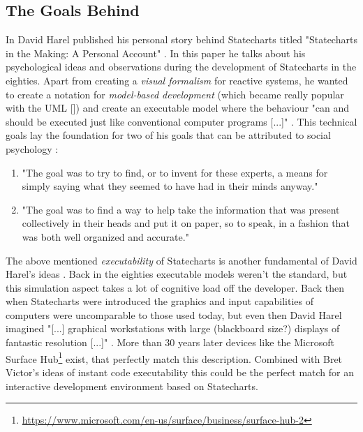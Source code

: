 \subsection{The Goals Behind}
\label{sub:goals-behind-statecharts}
In \citeyear{harel_statecharts_2007} David Harel published his personal story behind Statecharts titled "Statecharts in the Making: A Personal Account" \autocite{harel_statecharts_2007}.
In this paper he talks about his psychological ideas and observations during the development of Statecharts in the eighties.
Apart from creating a \emph{visual formalism} for reactive systems, he wanted to create a notation for \emph{model-based development} (which became really popular with the UML [\textcite{cook_unified_2017}]) and create an executable model where the behaviour "can and should be executed just like conventional computer programs [...]" \autocite[1]{harel_statecharts_2007}.
This technical goals lay the foundation for two of his goals that can be attributed to social psychology \autocite[3--4]{harel_statecharts_2007}:
\begin{enumerate}
    \item "The goal was to try to find, or to invent for these experts, a means for simply saying what they seemed to have had in their minds anyway."
    \item "The goal was to find a way to help take the information that was present collectively in their heads and put it on paper, so to speak, in a fashion that was both well organized and accurate."
\end{enumerate}

The above mentioned \emph{executability} of Statecharts is another fundamental of David Harel's ideas \autocite[7]{harel_modeling_1998}.
Back in the eighties executable models weren't the standard, but this simulation aspect takes a lot of cognitive load off the developer.
Back then when Statecharts were introduced the graphics and input capabilities of computers were uncomparable to those used today, but even then David Harel imagined "[...] graphical workstations with large (blackboard size?) displays of fantastic resolution [...]" \autocite[272]{harel_statecharts:_1987}.
More than 30 years later devices like the Microsoft Surface Hub\footnote{\url{https://www.microsoft.com/en-us/surface/business/surface-hub-2}} exist, that perfectly match this description.
Combined with Bret Victor's ideas of instant code executability \autocite{victor_inventing_2012} this could be the perfect match for an interactive development environment based on Statecharts.

